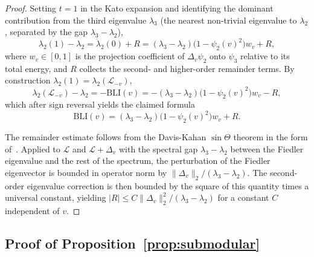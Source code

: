 \documentclass[12pt, a4paper]{article}
\begin{document}
\begin{proof}
Setting $t = 1$ in the Kato expansion and identifying the dominant contribution from the third eigenvalue $\lambda_3$ (the nearest non-trivial eigenvalue to $\lambda_2$, separated by the gap $\lambda_3 - \lambda_2$),
\begin{equation}
\lambda_2(1) - \lambda_2 = \dot\lambda_2(0) + R = (\lambda_3 - \lambda_2)\bigl(1 - \psi_2(v)^2\bigr) w_v + R,
\end{equation}
where $w_v \in [0, 1]$ is the projection coefficient of $\Delta_v \psi_2$ onto $\psi_3$ relative to its total energy, and $R$ collects the second- and higher-order remainder terms. By construction $\lambda_2(1) = \lambda_2(\mathcal{L}_{-v})$,
\begin{equation}
\lambda_2(\mathcal{L}_{-v}) - \lambda_2 = -\mathrm{BLI}(v) = -(\lambda_3 - \lambda_2)\bigl(1 - \psi_2(v)^2\bigr) w_v - R,
\end{equation}
which after sign reversal yields the claimed formula
\begin{equation}
\mathrm{BLI}(v) = (\lambda_3 - \lambda_2)\bigl(1 - \psi_2(v)^2\bigr) w_v + R.
\end{equation}

The remainder estimate follows from the Davis-Kahan $\sin\Theta$ theorem in the form of~\citet[Theorem 2]{yu2015useful}. Applied to $\mathcal{L}$ and $\mathcal{L} + \Delta_v$ with the spectral gap $\lambda_3 - \lambda_2$ between the Fiedler eigenvalue and the rest of the spectrum, the perturbation of the Fiedler eigenvector is bounded in operator norm by $\lVert \Delta_v \rVert_2 / (\lambda_3 - \lambda_2)$. The second-order eigenvalue correction is then bounded by the square of this quantity times a universal constant, yielding $\lvert R \rvert \leq C \lVert \Delta_v \rVert_2^2 / (\lambda_3 - \lambda_2)$ for a constant $C$ independent of $v$.
\end{proof}

\subsection{Proof of Proposition~\ref{prop:submodular}}\label{app:bli_submodular_proof}
\end{document}

